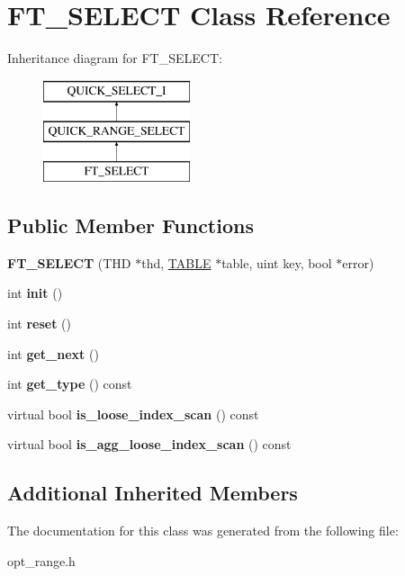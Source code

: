 \hypertarget{classFT__SELECT}{}\section{F\+T\+\_\+\+S\+E\+L\+E\+CT Class Reference}
\label{classFT__SELECT}
Inheritance diagram for F\+T\+\_\+\+S\+E\+L\+E\+CT\+:\begin{figure}[H]
\begin{center}
\leavevmode
\includegraphics[height=3.000000cm]{classFT__SELECT}
\end{center}
\end{figure}
\subsection*{Public Member Functions}
\begin{DoxyCompactItemize}
\item 
\mbox{\label{classFT__SELECT_a56f95a03679528d151505b4c77ddd062}} 
{\bfseries F\+T\+\_\+\+S\+E\+L\+E\+CT} (T\+HD $\ast$thd, \mbox{\hyperlink{structTABLE}{T\+A\+B\+LE}} $\ast$table, uint key, bool $\ast$error)
\item 
\mbox{\label{classFT__SELECT_ac0e39143d08ec45dcd0eaeb234c38af0}} 
int {\bfseries init} ()
\item 
\mbox{\label{classFT__SELECT_afa9c60e285550a49274b92d1acf1b71f}} 
int {\bfseries reset} ()
\item 
\mbox{\label{classFT__SELECT_a77c465a66ae5422f796b6bd69d227ff4}} 
int {\bfseries get\+\_\+next} ()
\item 
\mbox{\label{classFT__SELECT_ad162337f9cb030899c9824bc5faa4cc4}} 
int {\bfseries get\+\_\+type} () const
\item 
\mbox{\label{classFT__SELECT_a36e357a596f850d173fd5c0036445f34}} 
virtual bool {\bfseries is\+\_\+loose\+\_\+index\+\_\+scan} () const
\item 
\mbox{\label{classFT__SELECT_af16c85018d62294dc3ee5eee786a1998}} 
virtual bool {\bfseries is\+\_\+agg\+\_\+loose\+\_\+index\+\_\+scan} () const
\end{DoxyCompactItemize}
\subsection*{Additional Inherited Members}


The documentation for this class was generated from the following file\+:\begin{DoxyCompactItemize}
\item 
opt\+\_\+range.\+h\end{DoxyCompactItemize}
